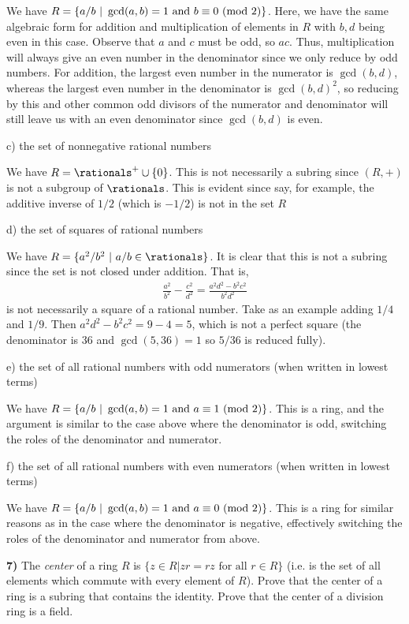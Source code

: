 \documentclass[12pt,a4paper]{article}
\newcommand{\prob}[2]{\textbf{#1)} #2}
\begin{document}
We have $R = \{a/b ~ | ~ \gcd(a,b) = 1 \text{ and } b \equiv 0 ~({\rm mod} ~ 2)\}$. Here, we have the same algebraic form for addition and multiplication of elements in $R$ with $b,d$ being even in this case. Observe that $a$ and $c$ must be odd, so $ac$. Thus, multiplication will always give an even number in the denominator since we only reduce by odd numbers. For addition, the largest even number in the numerator is $\gcd(b,d)$, whereas the largest even number in the denominator is $\gcd(b,d)^2$, so reducing by this and other common odd divisors of the numerator and denominator will still leave us with an even denominator since $\gcd(b,d)$ is even.

c) the set of nonnegative rational numbers

We have $R = \rationals^{+} \cup \{0\}$. This is not necessarily a subring since $(R,+)$ is not a subgroup of $\rationals$. This is evident since say, for example, the additive inverse of $1/2$ (which is $-1/2$) is not in the set $R$

d) the set of squares of rational numbers

We have $R = \{a^2/b^2 ~ | ~ a/b \in \rationals\}$. It is clear that this is not a subring since the set is not closed under addition. That is,
\begin{align*}
\frac{a^2}{b^2} - \frac{c^2}{d^2} = \frac{a^2d^2 - b^2c^2}{b^2d^2}
\end{align*}
is not necessarily a square of a rational number. Take as an example adding $1/4$ and $1/9$. Then $a^2d^2 - b^2c^2 = 9 - 4 = 5$, which is not a perfect square (the denominator is $36$ and $\gcd(5,36) = 1$ so $5/36$ is reduced fully).

e) the set of all rational numbers with odd numerators (when written in lowest terms)

We have $R = \{a/b ~ | ~ \gcd(a,b) = 1 \text{ and } a \equiv 1 ~ ({\rm mod} ~ 2)\}$. This is a ring, and the argument is similar to the case above where the denominator is odd, switching the roles of the denominator and numerator.

f) the set of all rational numbers with even numerators (when written in lowest terms)

We have $R = \{a/b ~ | ~ \gcd(a,b) = 1 \text{ and } a \equiv 0 ~ ({\rm mod} ~ 2)\}$. This is a ring for similar reasons as in the case where the denominator is negative, effectively switching the roles of the denominator and numerator from above.

\prob{7}{The \textit{center} of a ring $R$ is $\{z \in R | zr = rz \text{ for all } r \in R\}$ (i.e. is the set of all elements which commute with every element of $R$). Prove that the center of a ring is a subring that contains the identity. Prove that the center of a division ring is a field.}
\end{document}
